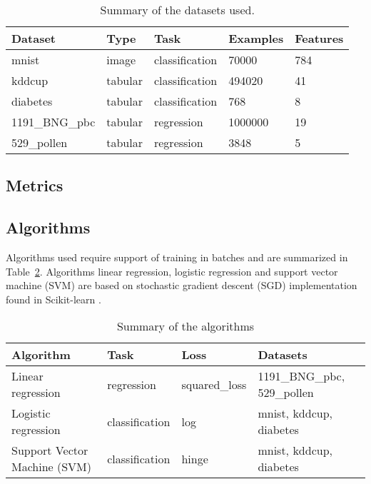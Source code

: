 \begin{table}[h]
    \centering
    \begin{tabular}{lllll}
        \toprule
        Dataset        & Type    & Task           & Examples & Features \\
        \midrule
        mnist          & image   & classification & 70000    & 784      \\
        kddcup         & tabular & classification & 494020   & 41       \\
        diabetes       & tabular & classification & 768      & 8        \\
        1191\_BNG\_pbc & tabular & regression     & 1000000  & 19       \\
        529\_pollen    & tabular & regression     & 3848     & 5        \\
        \bottomrule
    \end{tabular}
    \caption{Summary of the datasets used.}
    \label{table:datasets}
\end{table}



\subsection{Metrics}
\subsection{Algorithms}

Algorithms used require support of training in batches and are summarized in Table~\ref{table:algorithms}. Algorithms linear regression, logistic regression and support vector machine (SVM) are based on stochastic gradient descent (SGD) implementation found in Scikit-learn \parencite{pedregosaScikitlearnMachineLearning2011}.

\begin{table}[h]
    \centering
    \begin{tabular}{llll}
        \toprule
        Algorithm                    & Task           & Loss          & Datasets                    \\
        \midrule
        Linear regression            & regression     & squared\_loss & 1191\_BNG\_pbc, 529\_pollen \\
        Logistic regression          & classification & log           & mnist, kddcup, diabetes     \\
        Support Vector Machine (SVM) & classification & hinge         & mnist, kddcup, diabetes     \\
        \bottomrule
    \end{tabular}
    \caption{Summary of the algorithms}
    \label{table:algorithms}
\end{table}



